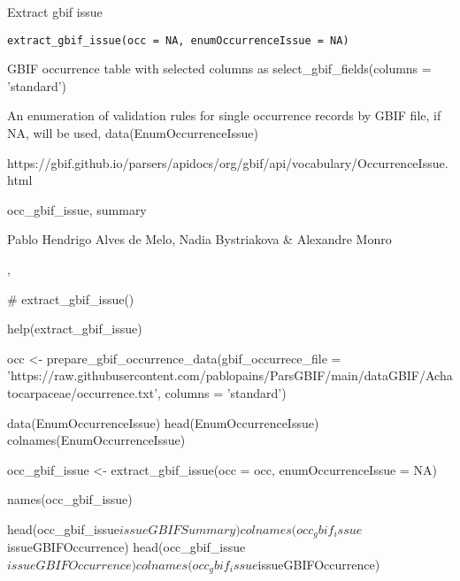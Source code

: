 \documentclass[a4paper]{book}
\begin{document}
%
\begin{Description}
Extract gbif issue
\end{Description}
%
\begin{Usage}
\begin{verbatim}
extract_gbif_issue(occ = NA, enumOccurrenceIssue = NA)
\end{verbatim}
\end{Usage}
%
\begin{Arguments}
\begin{ldescription}
\item[\code{occ}] GBIF occurrence table with selected columns as select\_gbif\_fields(columns = 'standard')

\item[\code{enumOccurrenceIssue}] An enumeration of validation rules for single occurrence records by GBIF file, if NA, will be used, data(EnumOccurrenceIssue)
\end{ldescription}
\end{Arguments}
%
\begin{Details}
https://gbif.github.io/parsers/apidocs/org/gbif/api/vocabulary/OccurrenceIssue.html
\end{Details}
%
\begin{Value}
occ\_gbif\_issue,
summary
\end{Value}
%
\begin{Author}
Pablo Hendrigo Alves de Melo,
Nadia Bystriakova \&
Alexandre Monro
\end{Author}
%
\begin{SeeAlso}
, 
\end{SeeAlso}
%
\begin{Examples}
\begin{ExampleCode}

# extract_gbif_issue()

help(extract_gbif_issue)

occ <- prepare_gbif_occurrence_data(gbif_occurrece_file =  'https://raw.githubusercontent.com/pablopains/ParsGBIF/main/dataGBIF/Achatocarpaceae/occurrence.txt',
                                    columns = 'standard')

data(EnumOccurrenceIssue)
head(EnumOccurrenceIssue)
colnames(EnumOccurrenceIssue)

occ_gbif_issue <- extract_gbif_issue(occ = occ,
                                     enumOccurrenceIssue = NA)

names(occ_gbif_issue)

head(occ_gbif_issue$issueGBIFSummary)

colnames(occ_gbif_issue$issueGBIFOccurrence)
head(occ_gbif_issue$issueGBIFOccurrence)
colnames(occ_gbif_issue$issueGBIFOccurrence)

\end{ExampleCode}
\end{Examples}
\end{document}
